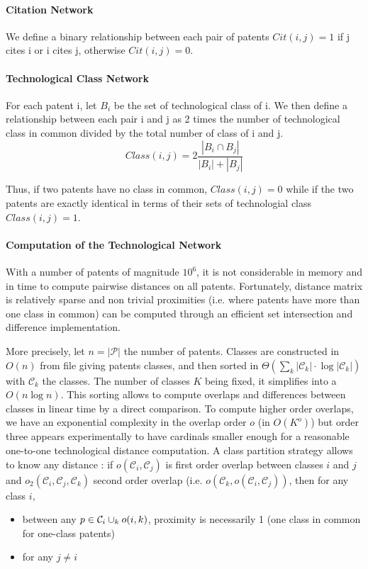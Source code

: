 \paragraph{Citation Network}

We define a binary relationship between each pair of patents $Cit(i, j) = 1$ if j cites i or i cites j, otherwise $Cit(i, j) = 0$. 

\paragraph{Technological Class Network}

For each patent i, let $B_i$ be the set of technological class of i. We then define a relationship between each pair i and j as 2 times the number of technological class in common divided by the total number of class of i and j. 
\[
Class(i,j) = 2\frac{\left\vert{B_i\cap B_j}\right\vert}{\left\vert{B_i}\right\vert+\left\vert{B_j}\right\vert}
\]

Thus, if two patents have no class in common, $Class(i,j)=0$ while if the two patents are exactly identical in terms of their sets of technologial class $Class(i,j)=1$.


\paragraph{Computation of the Technological Network}

With a number of patents of magnitude $10^6$, it is not considerable in memory and in time to compute pairwise distances on all patents. Fortunately, distance matrix is relatively sparse and non trivial proximities  (i.e. where patents have more than one class in common) can be computed through an efficient set intersection and difference implementation.

More precisely, let $n = \left|\mathcal{P}\right|$ the number of patents. Classes are constructed in $O(n)$ from file giving patents classes, and then sorted in $\Theta (\sum_k{\left|\mathcal{C}_k\right|\cdot \log{\left|\mathcal{C}_k\right|}})$ with $\mathcal{C}_k$ the classes. The number of classes $K$ being fixed, it simplifies into a $O(n\log{n})$. This sorting allows to compute overlaps and differences between classes in linear time by a direct comparison. To compute higher order overlaps, we have an exponential complexity in the overlap order $o$ (in $O(K^o)$) but order three appears experimentally to have cardinals smaller enough for a reasonable one-to-one technological distance computation. A class partition strategy allows to know any distance : if $o (\mathcal{C}_i,\mathcal{C}_j)$ is first order overlap between classes $i$ and $j$ and $o_2 (\mathcal{C}_i,\mathcal{C}_j,\mathcal{C}_k)$ second order overlap (i.e. $o(\mathcal{C}_k,o(\mathcal{C}_i,\mathcal{C}_j))$, then for any class $i$,
\begin{itemize}
\item between any $p\in \mathcal{C}_i \\ \cup_{k}{o(i,k)}$, proximity is necessarily 1 (one class in common for one-class patents)
\item for any $j \neq i$
\end{itemize}



